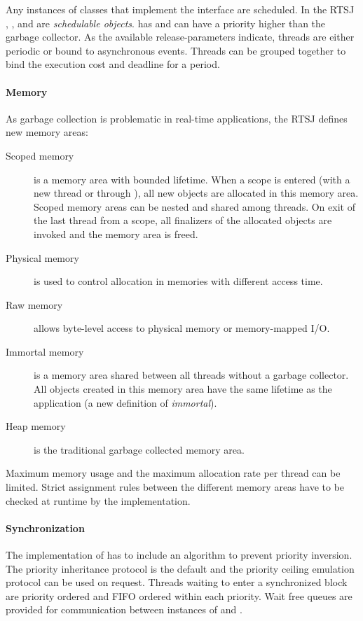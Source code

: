 Any instances of classes that implement the interface
 are scheduled. In the RTSJ ,
, and  are
\textit{schedulable objects}.  has and
 can have a priority higher than the garbage
collector. As the available release-parameters indicate, threads are
either periodic or bound to asynchronous events. Threads can be
grouped together to bind the execution cost and deadline for a
period.

\paragraph{Memory}

As garbage collection is problematic in real-time applications, the
RTSJ defines new memory areas:
%
\begin{description}
    \item[Scoped memory] is a memory area with bounded lifetime. When a scope is
entered (with a new thread or through ), all new
objects are allocated in this memory area. Scoped memory areas can
be nested and shared among threads. On exit of the last thread from
a scope, all finalizers of the allocated objects are invoked and the
memory area is freed.
    \item[Physical memory] is used to control allocation in memories with
different access time.
    \item[Raw memory] allows byte-level access to physical memory or memory-mapped I/O.
    \item[Immortal memory] is a memory area shared between
all threads without a garbage collector. All objects created in this
memory area have the same lifetime as the application (a new
definition of \textit{immortal}).
    \item[Heap memory] is the traditional garbage collected memory area.
\end{description}
%
Maximum memory usage and the maximum allocation rate per thread can
be limited. Strict assignment rules between the different memory
areas have to be checked at runtime by the implementation.

\paragraph{Synchronization}

The implementation of  has to include an
algorithm to prevent priority inversion. The priority inheritance
protocol is the default and the priority ceiling emulation protocol
can be used on request. Threads waiting to enter a synchronized
block are priority ordered and FIFO ordered within each priority.
Wait free queues are provided for communication between instances of
 and .

